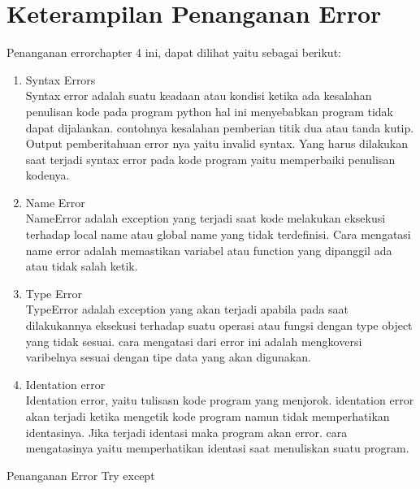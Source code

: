 \chapter{Keterampilan Penanganan Error}
	Penanganan  errorchapter 4 ini, dapat dilihat  yaitu sebagai berikut:
\begin{enumerate}
  		\item Syntax Errors\\
		Syntax error adalah suatu keadaan atau kondisi ketika ada kesalahan penulisan kode pada program python hal ini menyebabkan program tidak dapat dijalankan. contohnya kesalahan pemberian titik dua atau tanda kutip. Output pemberitahuan error nya yaitu invalid syntax. Yang harus dilakukan saat terjadi syntax error pada kode program yaitu memperbaiki penulisan kodenya.
		
		\item Name Error\\
		NameError adalah exception yang terjadi saat kode melakukan eksekusi terhadap local name atau global name yang tidak terdefinisi. Cara mengatasi name error adalah memastikan variabel atau function yang dipanggil ada atau tidak salah ketik.
		
		\item Type Error\\
		TypeError adalah exception yang akan terjadi apabila pada saat dilakukannya eksekusi terhadap suatu operasi atau fungsi dengan type object yang tidak sesuai. cara mengatasi dari error ini adalah mengkoversi varibelnya sesuai dengan tipe data yang akan digunakan.
		
		\item Identation error\\
        Identation error, yaitu tulisasn kode program yang menjorok. identation error akan terjadi ketika mengetik kode program namun tidak memperhatikan identasinya. Jika terjadi identasi maka program akan error. cara mengatasinya yaitu memperhatikan identasi saat menuliskan suatu program.
\end{enumerate}
\newpage
	\item Penanganan Error Try except
	